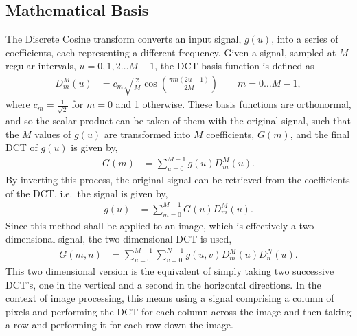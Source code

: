 \subsection{Mathematical Basis} %
\label{sub:mathematical_basis}
The Discrete Cosine transform converts an input signal, $g(u)$, into a series of coefficients, each representing a different frequency. Given a signal, sampled at $M$ regular intervals, $u=0,1,2\ldots M-1$, the DCT basis function is defined as
\begin{align}
	D_m^M(u) &= c_m \sqrt{\frac{2}{M}}\cos\left(\frac{\pi m(2u+1)}{2M}\right) \qquad m=0\ldots M-1,
\end{align}
where $c_m=\frac{1}{\sqrt 2}$ for $m=0$ and 1 otherwise. These basis functions are orthonormal, and so the scalar product can be taken of them with the original signal, such that the $M$ values of $g(u)$ are transformed into $M$ coefficients, $G(m)$, and the final DCT of $g(u)$ is given by,
\begin{align}
	G(m) &= \sum_{u=0}^{M-1} g(u) D_m^M(u).
\end{align}
By inverting this process, the original signal can be retrieved from the coefficients of the DCT, i.e.\ the signal is given by,
\begin{align}
	g(u) &= \sum_{m=0}^{M-1} G(u) D_m^M(u).
\end{align}
Since this method shall be applied to an image, which is effectively a two dimensional signal, the two dimensional DCT is used,
\begin{align}
	G(m,n) &= \sum_{u=0}^{M-1}\sum_{v=0}^{N-1} g(u,v) D_m^M(u)D_n^N(u).
\end{align}
This two dimensional version is the equivalent of simply taking two successive DCT's, one in the vertical and a second in the horizontal directions. In the context of image processing, this means using a signal comprising a column of pixels and performing the DCT for each column across the image and then taking a row and performing it for each row down the image.


